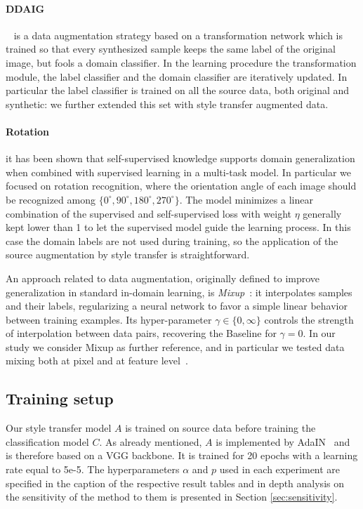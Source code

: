 \paragraph{DDAIG}~\cite{zhou2020deep} is a data augmentation strategy based on a transformation network which is trained so that every synthesized sample keeps the same label of the original image, but fools a domain classifier. In the learning procedure the transformation module, the label classifier and the domain classifier are iteratively updated. In particular the label classifier is trained on all the source data, both original and synthetic: we further extended this set with style transfer augmented data. 
\paragraph{Rotation~\cite{lopez_rotation}} it has been shown that self-supervised knowledge supports domain generalization when combined with supervised learning in a multi-task model. In particular we focused on rotation recognition, where the orientation angle of each image should be recognized among $\{0^\circ, 90^\circ, 180^\circ, 270^\circ\}$. The model minimizes a linear combination of the supervised and self-supervised loss with weight $\eta$ generally kept lower than 1 to let the supervised model guide the learning process.
In this case the domain labels are not used during training, so the application of the source augmentation by style transfer is straightforward.

An approach related to data augmentation, originally defined to improve generalization in standard in-domain learning, is \emph{Mixup}~\cite{zhang2018mixup}: it interpolates samples and their labels, regularizing a neural network to favor a simple linear behavior between training examples. Its hyper-parameter $\gamma \in \{0,\infty\}$ controls the strength of interpolation between data pairs, recovering the Baseline for $\gamma=0$. In our study we consider Mixup as further reference, and in particular we tested data mixing both at pixel and at feature level~\cite{xu2020adversarial}.

\subsection{Training setup}

Our style transfer model $A$ is trained on source data before training the classification model $C$. As already mentioned, $A$ is implemented by AdaIN~\cite{Huang_2017_ICCV_adain} and is therefore based on a VGG backbone. It is trained for 20 epochs with a learning rate equal to 5e-5. The hyperparameters $\alpha$ and $p$ used in each experiment are specified in the caption of the respective result tables and in depth analysis on the sensitivity of the method to them is presented in Section \ref{sec:sensitivity}.

